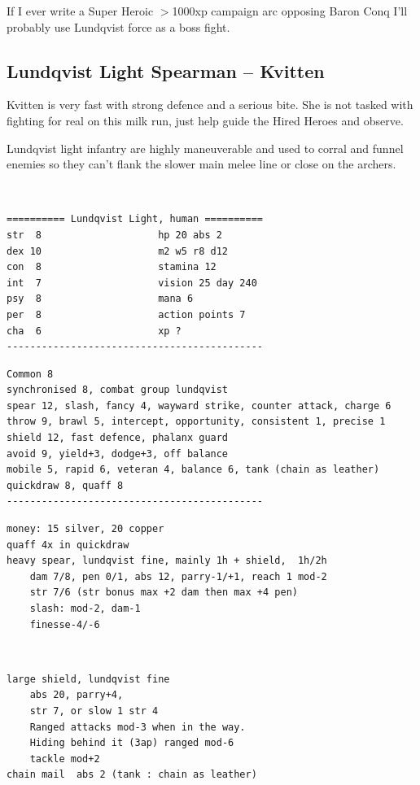\begin{readoutloud}
If I ever write a Super Heroic $>$1000xp campaign arc opposing Baron Conq I'll probably use Lundqvist force as a boss fight.
\end{readoutloud}


\subsection*{Lundqvist Light Spearman -- Kvitten}

Kvitten is very fast with strong defence and a serious bite. She is not tasked with fighting for real on this milk run, just help guide the Hired Heroes and observe.

Lundqvist light infantry are highly maneuverable and used to corral and funnel enemies so they can't flank the slower main melee line or close on the archers.

\

\goodbreak \small \begin{samepage} \begin{verbatim}
========== Lundqvist Light, human ==========
str  8                    hp 20 abs 2
dex 10                    m2 w5 r8 d12
con  8                    stamina 12
int  7                    vision 25 day 240
psy  8                    mana 6
per  8                    action points 7
cha  6                    xp ?
--------------------------------------------
\end{verbatim} \goodbreak \begin{verbatim}
Common 8
synchronised 8, combat group lundqvist
spear 12, slash, fancy 4, wayward strike, counter attack, charge 6
throw 9, brawl 5, intercept, opportunity, consistent 1, precise 1
shield 12, fast defence, phalanx guard
avoid 9, yield+3, dodge+3, off balance
mobile 5, rapid 6, veteran 4, balance 6, tank (chain as leather)
quickdraw 8, quaff 8
--------------------------------------------
\end{verbatim} \goodbreak \begin{verbatim}
money: 15 silver, 20 copper
quaff 4x in quickdraw
heavy spear, lundqvist fine, mainly 1h + shield,  1h/2h
    dam 7/8, pen 0/1, abs 12, parry-1/+1, reach 1 mod-2
    str 7/6 (str bonus max +2 dam then max +4 pen)
    slash: mod-2, dam-1
    finesse-4/-6
\end{verbatim} \end{samepage}   \   \goodbreak \begin{samepage} \begin{verbatim}
large shield, lundqvist fine
    abs 20, parry+4,
    str 7, or slow 1 str 4
    Ranged attacks mod-3 when in the way.
    Hiding behind it (3ap) ranged mod-6
    tackle mod+2
chain mail  abs 2 (tank : chain as leather)
\end{verbatim} \end{samepage} \normalsize

